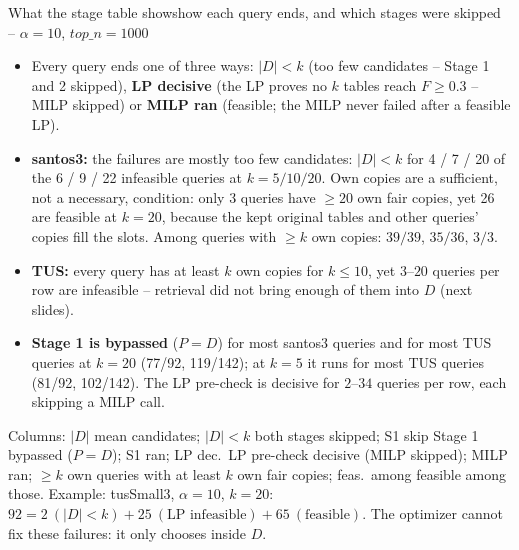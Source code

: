 \documentclass[aspectratio=169,10pt]{beamer}
\newcommand{\highlight}[1]{{\color{Cat1}\bfseries #1}}
\begin{document}
\begin{frame}{What the stage table shows}{how each query ends, and which stages were skipped -- $\alpha{=}10$, $top\_n{=}1000$}
\small
\begin{itemize}\setlength\itemsep{4pt}
\item Every query ends one of three ways: \highlight{$|D|<k$} (too few candidates -- Stage 1 and 2 skipped), \highlight{LP decisive} (the LP proves no $k$ tables reach $F\ge0.3$ -- MILP skipped) or \highlight{MILP ran} (feasible; the MILP never failed after a feasible LP).
\item \highlight{santos3:} the failures are mostly too few candidates: $|D|{<}k$ for 4 / 7 / 20 of the 6 / 9 / 22 infeasible queries at $k{=}5/10/20$. Own copies are a sufficient, not a necessary, condition: only 3 queries have $\ge20$ own fair copies, yet 26 are feasible at $k{=}20$, because the kept original tables and other queries' copies fill the slots. Among queries with $\ge k$ own copies: $39/39$, $35/36$, $3/3$.
\item \highlight{TUS:} every query has at least $k$ own copies for $k\le10$, yet $3$--$20$ queries per row are infeasible -- retrieval did not bring enough of them into $D$ (next slides).
\item \highlight{Stage 1 is bypassed} ($P{=}D$) for most santos3 queries and for most TUS queries at $k{=}20$ (77/92, 119/142); at $k{=}5$ it runs for most TUS queries (81/92, 102/142). The LP pre-check is decisive for $2$--$34$ queries per row, each skipping a MILP call.
\end{itemize}
\vspace{2pt}
{\footnotesize\color{Muted} Columns: $|D|$ mean candidates; $|D|{<}k$ both stages skipped; S1 skip Stage 1 bypassed ($P{=}D$); S1 ran; LP dec.\ LP pre-check decisive (MILP skipped); MILP ran; $\ge k$ own queries with at least $k$ own fair copies; feas.\ among feasible among those.}
\vspace{2pt}
{\footnotesize\color{Muted} Example: tusSmall3, $\alpha{=}10$, $k{=}20$: $92 = 2\ (|D|{<}k) + 25\ (\text{LP infeasible}) + 65\ (\text{feasible})$. The optimizer cannot fix these failures: it only chooses inside $D$.}
\end{frame}
\end{document}
